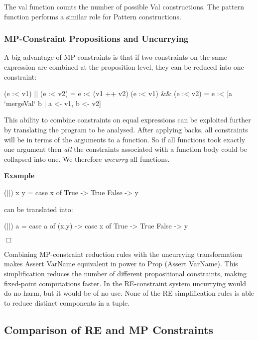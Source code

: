\documentclass[preprint]{sigplanconf}
\newcommand{\C}[1]{\textsf{#1}}
\newcounter{exmp}
\newcommand{\yesexample}{\addtocounter{exmp}{1}\addvspace{2mm}\noindent\textbf{Example \arabic{exmp}}}
\newcommand{\noexample}{\hfill\ensuremath{\Box}\par\addvspace{2mm}}
\newenvironment{example}{\yesexample}{\noexample}
\newcommand{\ignore}{}
\begin{document}
The \C{val} function counts the number of possible \C{Val} constructions. The \C{pattern} function performs a similar role for \C{Pattern} constructions.


\subsubsection{MP-Constraint Propositions and Uncurrying}

A big advantage of MP-constraints is that if two constraints on the same expression are combined at the proposition level, they can be reduced into one constraint:

\ignore\begin{code}
(e :< v1) || (e :< v2) = e :< (v1 ++ v2)
(e :< v1) && (e :< v2) = e :< [a `mergeVal` b | a <- v1, b <- v2]
\end{code}

\noindent This ability to combine constraints on equal expressions can be exploited further by translating the program to be analysed. After applying \C{backs}, all constraints will be in terms of the arguments to a function. So if all functions took exactly one argument then \textit{all} the constraints associated with a function body could be collapsed into one. We therefore \textit{uncurry} all functions.

\begin{example}
\begin{code}
(||) x y = case  x of
                      True   -> True
                      False  -> y
\end{code}

\noindent can be translated into:

\begin{code}
(||) a = case  a of
                    (x,y) -> case  x of
                                   True    -> True
                                   False   -> y
\end{code}
\end{example}

Combining MP-constraint reduction rules with the uncurrying transformation makes \C{Assert VarName} equivalent in power to \C{Prop (Assert VarName)}. This simplification reduces the number of different propositional constraints, making fixed-point computations faster. In the RE-constraint system uncurrying would do no harm, but it would be of no use. None of the RE simplification rules is able to reduce distinct components in a tuple.

\subsection{Comparison of RE and MP Constraints}
\end{document}
